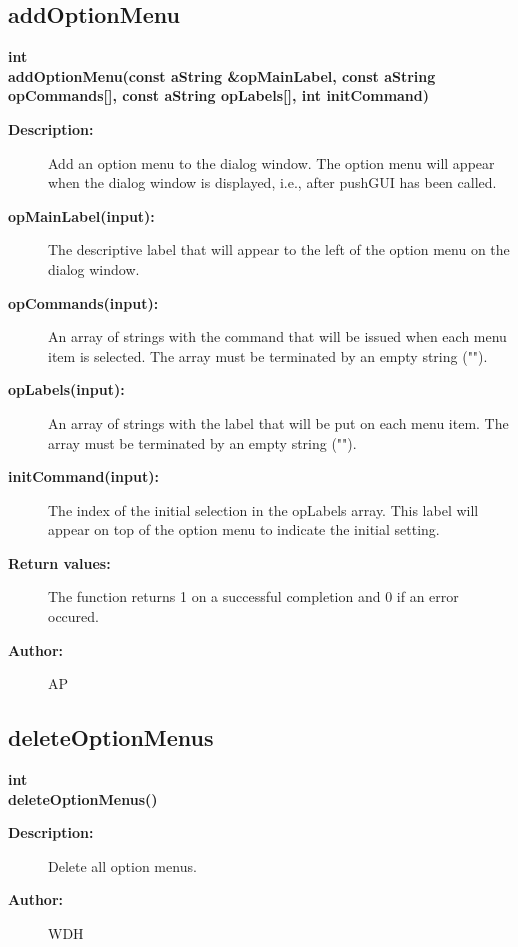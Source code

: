 \subsection{addOptionMenu}
 
\begin{flushleft} \textbf{%
int  \\ 
\settowidth{\DialogDataIncludeArgIndent}{addOptionMenu(}%
addOptionMenu(const aString \&opMainLabel, const aString opCommands[], const aString opLabels[], int initCommand)
}\end{flushleft}
\begin{description}
\item[{\bf Description:}]  Add an option menu to the dialog window. The option menu will appear when the
 dialog window is displayed, i.e., after pushGUI has been called.

\item[{\bf opMainLabel(input):}]  The descriptive label that will appear to the left of the option menu
  on the dialog window.
\item[{\bf opCommands(input):}]  An array of strings with the command that will be issued when each menu
  item is selected. The array must be terminated by an empty string ("").
\item[{\bf opLabels(input):}]  An array of strings with the label that will be put on each menu
  item. The array must be terminated by an empty string ("").
\item[{\bf initCommand(input):}]  The index of the initial selection in the opLabels array. This label will
  appear on top of the option menu to indicate the initial setting.
\item[{\bf Return values:}]  The function returns 1 on a successful completion and 0 if an error occured.
\item[{\bf Author:}]  AP
\end{description}
\subsection{deleteOptionMenus}
 
\begin{flushleft} \textbf{%
int  \\ 
\settowidth{\DialogDataIncludeArgIndent}{deleteOptionMenus(}%
deleteOptionMenus()
}\end{flushleft}
\begin{description}
\item[{\bf Description:}]  Delete all option menus.
\item[{\bf Author:}]  WDH 
\end{description}
